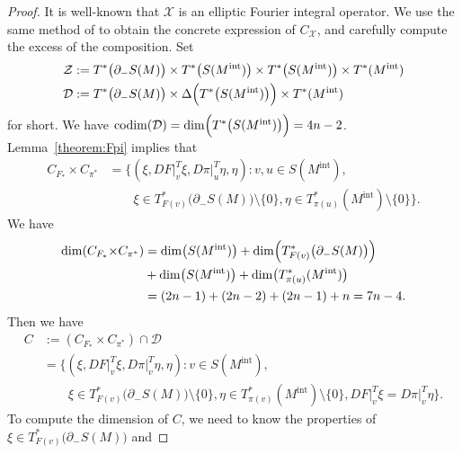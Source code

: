 \documentclass[a4paper,11pt,reqno]{amsart}
\numberwithin{equation}{section}
\theoremstyle{definition}
\theoremstyle{remark}
\begin{document}
\begin{proof}
It is well-known that $\mathcal{X}$ is an elliptic Fourier integral operator. 
We use the same method of \cite{HolmanUhlmann} to obtain the concrete expression of $C_\mathcal{X}$, and carefully compute the excess of the composition. Set 
%
%
\begin{align*}
  \mathcal{Z}
& :=
  T^\ast\bigl(\partial_-S(M)\bigr)
  \times
  T^\ast\bigl(S(M^\text{int})\bigr)
  \times
  T^\ast\bigl(S(M^\text{int})\bigr)
  \times
  T^\ast(M^\text{int})\\
  \mathcal{D}
& :=
  T^\ast\bigl(\partial_-S(M)\bigr)
  \times
  \Delta\Bigl(T^\ast\bigl(S(M^\text{int})\bigr)\Bigr)
  \times
  T^\ast(M^\text{int})
\end{align*}
%
%
for short. We have 
$\operatorname{codim}(\mathcal{D})=\operatorname{dim}\Bigl(T^\ast\bigl(S(M^\text{int})\bigr)\Bigr)=4n-2$. 
Lemma~\ref{theorem:Fpi} implies that 
%
%
\begin{align*}
  C_{F_\ast}{\times}C_{\pi^\ast}
& =
  \bigl\{
  (\xi,DF\vert^T_v\xi,D\pi\vert^T_u\eta,\eta)
  : 
  v,u \in S(M^\text{int}),
\\
& \qquad  
  \xi \in T^\ast_{F(v)}\bigl(\partial_-S(M)\bigr)\setminus\{0\}, 
  \eta \in T^\ast_{\pi(u)}(M^\text{int})\setminus\{0\}
  \bigr\}. 
\end{align*}
%
%
We have 
%
%
\begin{align*}
  \operatorname{dim}(C_{F_\ast}{\times}C_{\pi^\ast})
& =
  \operatorname{dim}\bigl(S(M^\text{int})\bigr)
  +
  \operatorname{dim}\Bigl(T^\ast_{F(v)}\bigl(\partial_-S(M)\bigr)\Bigr)
\\
& +
  \operatorname{dim}\bigl(S(M^\text{int})\bigr)
  +
  \operatorname{dim}\bigl(T^\ast_{\pi(u)}(M^\text{int})\bigr)
\\
& =
  (2n-1)+(2n-2)+(2n-1)+n=7n-4.
\end{align*}
%
%
Then we have 
%
%
\begin{align}
  C
& :=
  (C_{F_\ast}{\times}C_{\pi^\ast})
  \cap
  \mathcal{D}
\nonumber
\\
& =
  \bigl\{
  (\xi,DF\vert^T_v\xi,D\pi\vert^T_v\eta,\eta)
  : 
  v \in S(M^\text{int}),
\nonumber 
\\
& \qquad 
  \xi \in T^\ast_{F(v)}\bigl(\partial_-S(M)\bigr)\setminus\{0\}, 
  \eta \in T^\ast_{\pi(v)}(M^\text{int})\setminus\{0\}, 
  DF\vert^T_v\xi=D\pi\vert^T_v\eta
  \bigr\}.
\label{equation:transversal1} 
\end{align}
%
%
To compute the dimension of $C$, we need to know the properties of 
$\xi \in T^\ast_{F(v)}\bigl(\partial_-S(M)\bigr)$ and  

\end{proof}
\end{document}
